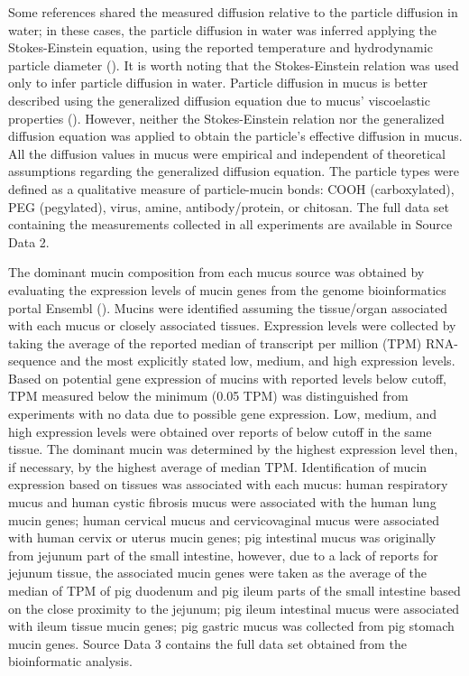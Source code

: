 \documentclass[aps,prl,preprint,superscriptaddress,showkeys,linenumbers]{revtex4-1}
\begin{document}
Some references shared the measured diffusion relative to the particle diffusion in water; in these cases, the particle diffusion in water was inferred applying the Stokes-Einstein equation, using the reported temperature and hydrodynamic particle diameter (\cite{MillerPRS1924}). It is worth noting that the Stokes-Einstein relation was used only to infer particle diffusion in water. Particle diffusion in mucus is better described using the generalized diffusion equation due to mucus' viscoelastic properties (\cite{SpagnSPRINGER2015}). However, neither the Stokes-Einstein relation nor the generalized diffusion equation was applied to obtain the particle's effective diffusion in mucus. All the diffusion values in mucus were empirical and independent of theoretical assumptions regarding the generalized diffusion equation.  The particle types were defined as a qualitative measure of particle-mucin bonds: COOH (carboxylated), PEG (pegylated), virus, amine, antibody/protein, or chitosan. The full data set containing the measurements collected in all experiments are available in Source Data 2. 

The dominant mucin composition from each mucus source was obtained by evaluating the expression levels of mucin genes from the genome bioinformatics portal Ensembl (\cite{ZerbinoNAR2018}). Mucins were identified assuming the tissue/organ associated with each mucus or closely associated tissues. Expression levels were collected by taking the average of the reported median of transcript per million (TPM) RNA-sequence and the most explicitly stated low, medium, and high expression levels. Based on potential gene expression of mucins with reported levels below cutoff, TPM measured below the minimum (0.05 TPM) was distinguished from experiments with no data due to possible gene expression. Low, medium, and high expression levels were obtained over reports of below cutoff in the same tissue. The dominant mucin was determined by the highest expression level then, if necessary, by the highest average of median TPM. 
Identification of mucin expression based on tissues was associated with each mucus: human respiratory mucus and human cystic fibrosis mucus were associated with the human lung mucin genes; human cervical mucus and cervicovaginal mucus were associated with human cervix or uterus mucin genes; pig intestinal mucus was originally from jejunum part of the small intestine, however, due to a lack of reports for jejunum tissue, the associated mucin genes were taken as the average of the median of TPM of pig duodenum and pig ileum parts of the small intestine based on the close proximity to the jejunum; pig ileum intestinal mucus were associated with ileum tissue mucin genes; pig gastric mucus was collected from pig stomach mucin genes. Source Data 3 contains the full data set obtained from the bioinformatic analysis.
\end{document}
